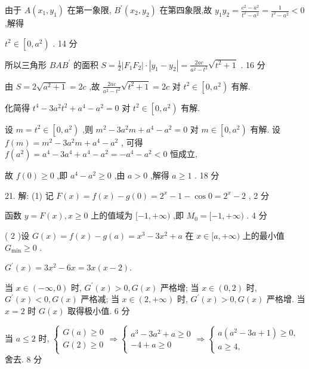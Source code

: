 \documentclass[10pt]{article}
\begin{document}
由于 \(A\left( {{x}_{1},{y}_{1}}\right)\) 在第一象限, \({B}^{\prime }\left( {{x}_{2},{y}_{2}}\right)\) 在第四象限,故 \({y}_{1}{y}_{2} = \frac{{c}^{2} - {a}^{2}}{{t}^{2} - {a}^{2}} = \frac{1}{{t}^{2} - {a}^{2}} < 0\) ,解得

\({t}^{2} \in  \left\lbrack  {0,{a}^{2}}\right)\) . 14 分

所以三角形 \({BA}{B}^{\prime }\) 的面积 \(S = \frac{1}{2}\left| {{F}_{1}{F}_{2}}\right|  \cdot  \left| {{y}_{1} - {y}_{2}}\right|  = \frac{2ac}{{a}^{2} - {t}^{2}}\sqrt{{t}^{2} + 1}\) . 16 分

由 \(S = 2\sqrt{{a}^{2} + 1} = {2c}\) ,故 \(\frac{2ac}{{a}^{2} - {t}^{2}}\sqrt{{t}^{2} + 1} = {2c}\) 对 \({t}^{2} \in  \left\lbrack  {0,{a}^{2}}\right)\) 有解.

化简得 \({t}^{4} - 3{a}^{2}{t}^{2} + {a}^{4} - {a}^{2} = 0\) 对 \({t}^{2} \in  \left\lbrack  {0,{a}^{2}}\right)\) 有解.

设 \(m = {t}^{2} \in  \left\lbrack  {0,{a}^{2}}\right)\) ,则 \({m}^{2} - 3{a}^{2}m + {a}^{4} - {a}^{2} = 0\) 对 \(m \in  \left\lbrack  {0,{a}^{2}}\right)\) 有解. 设 \(f\left( m\right)  = {m}^{2} - 3{a}^{2}m + {a}^{4} - {a}^{2}\) , 可得 \(f\left( {a}^{2}\right)  = {a}^{4} - 3{a}^{4} + {a}^{4} - {a}^{2} =  - {a}^{4} - {a}^{2} < 0\) 恒成立,

故 \(f\left( 0\right)  \geq  0\) ,即 \({a}^{4} - {a}^{2} \geq  0\) ,由 \(a > 0\) ,解得 \(a \geq  1\) . 18 分

21. 解: (1) 记 \(F\left( x\right)  = f\left( x\right)  - g\left( 0\right)  = {2}^{x} - 1 - \cos 0 = {2}^{x} - 2\) , 2 分

函数 \(y = F\left( x\right) ,x \geq  0\) 上的值域为 \(\lbrack  - 1, + \infty )\) ,即 \({M}_{0} = \lbrack  - 1, + \infty )\) . 4 分

( 2 )设 \(G\left( x\right)  = f\left( x\right)  - g\left( a\right)  = {x}^{3} - 3{x}^{2} + a\) 在 \(x \in  \lbrack a, + \infty )\) 上的最小值 \({G}_{\min } \geq  0\) .

\({G}^{\prime }\left( x\right)  = 3{x}^{2} - {6x} = {3x}\left( {x - 2}\right) .\)

当 \(x \in  \left( {-\infty ,0}\right)\) 时, \({G}^{\prime }\left( x\right)  > 0,G\left( x\right)\) 严格增; 当 \(x \in  \left( {0,2}\right)\) 时, \({G}^{\prime }\left( x\right)  < 0,G\left( x\right)\) 严格减; 当 \(x \in  \left( {2, + \infty }\right)\) 时, \({G}^{\prime }\left( x\right)  > 0,G\left( x\right)\) 严格增. 当 \(x = 2\) 时 \(G\left( x\right)\) 取得极小值. 6 分

当 \(a \leq  2\) 时, \(\left\{  {\begin{array}{l} G\left( a\right)  \geq  0 \\  G\left( 2\right)  \geq  0 \end{array} \Rightarrow  \left\{  {\begin{array}{l} {a}^{3} - 3{a}^{2} + a \geq  0 \\   - 4 + a \geq  0 \end{array} \Rightarrow  \left\{  \begin{array}{l} a\left( {{a}^{2} - {3a} + 1}\right)  \geq  0, \\  a \geq  4, \end{array}\right. }\right. }\right.\) 舍去. 8 分
\end{document}
